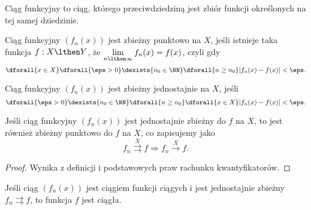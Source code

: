 Ciąg funkcyjny to ciąg, którego przeciwdziedziną jest zbiór funkcji określonych na tej samej dziedzinie.
\begin{definition}
    Ciąg funkcyjny $(f_n(x))$ jest zbieżny punktowo na $X$, jeśli istnieje taka funkcja $f: X \lthen Y$, że $\lim\limits_{n\lthen\infty} f_n(x) = f(x)$, czyli gdy
    \[ \dforall{x \in X} \dforall{\eps > 0} \dexists{n_0 \in \NN} \dforall{n \geq n_0} |f_n(x) - f(x)| < \eps. \]
\end{definition}

\begin{definition}
    Ciąg funkcyjny $(f_n(x))$ jest zbieżny jednostajnie na $X$, jeśli
    \[ \dforall{\eps > 0} \dexists{n_0 \in \NN} \dforall{n \geq n_0} \dforall{x \in X} |f_n(x) - f(x)| < \eps. \]
\end{definition}

\begin{theorem}
    \label{t:uniform convergence implies pointwise convergence}
    Jeśli ciąg funkcyjny $(f_n(x))$ jest jednostajnie zbieżny do $f$ na $X$, to jest również zbieżny punktowo do $f$ na $X$, co zapisujemy jako
    \[ f_n \overset{X}{\rightrightarrows} f \Longrightarrow f_n  \overset{X}{\rightarrow} f. \]
\end{theorem}
\begin{proof}
    Wynika z definicji i podstawowych praw rachunku kwantyfikatorów.
\end{proof}

\begin{theorem}
    Jeśli ciąg $(f_n(x))$ jest ciągiem funkcji ciągych i jest jednostajnie zbieżny $f_n \rightrightarrows f$, to funkcja $f$ jest ciągła.
\end{theorem}

